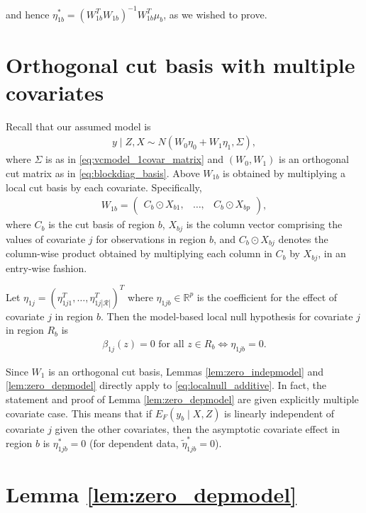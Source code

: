 and hence $\eta_{1b}^*= (W_{1b}^T W_{1b})^{-1} W_{1b}^T \mu_b$, as we wished to prove.


\section{Orthogonal cut basis with multiple covariates}
\label{supplsec:cutbasis_multiplecovar}

Recall that our assumed model is
\begin{align}
 y \mid Z, X \sim N(W_0 \eta_0 + W_1 \eta_1, \Sigma),
\nonumber
\end{align}
where $\Sigma$ is as in \eqref{eq:vcmodel_1covar_matrix} and $(W_0,W_1)$ is an orthogonal cut matrix as in \eqref{eq:blockdiag_basis}. Above $W_{1b}$ is obtained by multiplying a local cut basis by each covariate. 
Specifically,
\begin{align}
 W_{1b}= \begin{pmatrix} C_b \odot X_{b 1}, & \ldots, & C_b \odot X_{b p} \end{pmatrix},
\nonumber
\end{align}
where $C_b$ is the cut basis of region $b$, $X_{b j}$ is the column vector comprising the values of covariate $j$ for observations in region $b$, 
and $C_b \odot X_{b j}$ denotes the column-wise product obtained by multiplying each column in $C_b$ by $X_{b j}$, in an entry-wise fashion.

Let $\eta_{1j}=(\eta_{1j1}^T,\ldots,\eta_{1j|\mathcal{R}|}^T)^T$ where $\eta_{1jb} \in \mathbb{R}^p$ is the coefficient for the effect of covariate $j$ in region $b$. Then
the model-based local null hypothesis for covariate $j$ in region $R_b$ is 
\begin{align}
 \beta_{1j}(z)= 0 \mbox{ for all } z \in R_b  \Longleftrightarrow  \eta_{1jb} = 0.
\label{eq:localnull_additive}
\end{align}

Since $W_1$ is an orthogonal cut basis, Lemmas \ref{lem:zero_indepmodel} and \ref{lem:zero_depmodel}  directly apply to \eqref{eq:localnull_additive}. In fact, the statement and proof of Lemma \ref{lem:zero_depmodel} are given explicitly multiple covariate case.
This means that  if $E_F(y_b \mid X,Z)$ is linearly independent of covariate $j$ given the other covariates, then the asymptotic covariate effect in region $b$ is $\eta_{1jb}^*=0$ (for dependent data, $\tilde{\eta}_{1jb}^*=0$).



\section{Lemma \ref{lem:zero_depmodel}}
\label{supplsec:zero_depmodel}


